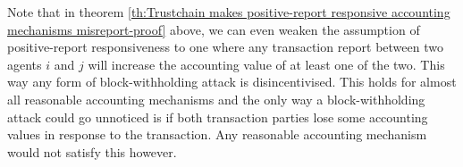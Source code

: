 \begin{comment}
\begin{remark}[]\ \\
\label{rem:Jetse Fair Witness Selection Protocol}
\noindent{}In \cite{Jetse Thesis} Brouwer et al. (2020) introduce a supplementary mechanism on top of the TrustChain architecture, which they refer to as a "fair witness selection protocol". This mechanism adds additional signatures from randomly selected agents in the network to every transaction which validate the interaction. The witnesses are chosen based on the hash value of the transaction such that the sets of selected witnesses from adjacent transactions overlap. This prevents the block-withholding attack mentioned in $(ii)$ in the proof above, without the requirement for positive-report responsiveness. In their work Brouwer et al. show that they can reduce the probability of a block-withholding to attack to the chance of a SHA-256 hash collision. Given the fact that this probability is in the order of magnitute of the probability of brute-forcing a private key, we know that the probability of such a misreport going undetected is as high as the probability of a misreport of type $(iv)$ going undetected. This leads to the following corrollary.\vspace{1em}\\
\end{remark}

\begin{corollary}[]\ \\
\label{cor:Trustchain is misreport-proof without positive-report responsiveness}
\noindent{}The remark above in combination with theorem \ref{th:Trustchain makes positive-report responsive accounting mechanisms misreport-proof} let's us conclude that any accounting mechanism linked to TrustChain is misreport-proof in the sense of definition \ref{def:Misreport-Proofness}.
\end{corollary}
\end{comment}

\noindent{}Note that in theorem \ref{th:Trustchain makes positive-report responsive accounting mechanisms misreport-proof} above, we can even weaken the assumption of positive-report responsiveness to one where any transaction report between two agents $i$ and $j$ will increase the accounting value of at least one of the two. This way any form of block-withholding attack is disincentivised. This holds for almost all reasonable accounting mechanisms and the only way a block-withholding attack could go unnoticed is if both transaction parties lose some accounting values in response to the transaction. Any reasonable accounting mechanism would not satisfy this however. \vspace{1em}\\


